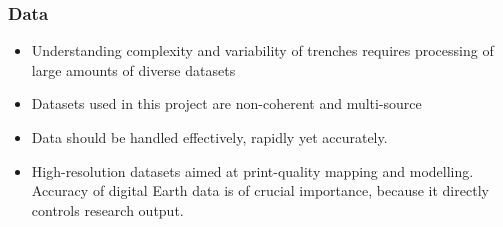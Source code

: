 \documentclass[pdflatex,compress,8pt,
	xcolor={dvipsnames,svgnames,x11names,table},
	hyperref={colorlinks = true,breaklinks = true, urlcolor = NavyBlue}]{beamer}
\begin{document}
\begin{frame}\frametitle{Data}
\vspace{1em}
\begin{itemize}\footnotesize
            \item Understanding complexity and variability of trenches requires processing of large amounts of diverse datasets 
            \item Datasets used in this project are non-coherent and multi-source 
            \item Data should be handled effectively, rapidly yet accurately.
            \item High-resolution datasets aimed at print-quality mapping and modelling. Accuracy of digital Earth data is of crucial importance, because it directly controls research output. 
\end{itemize}


\end{frame}
\end{document}
